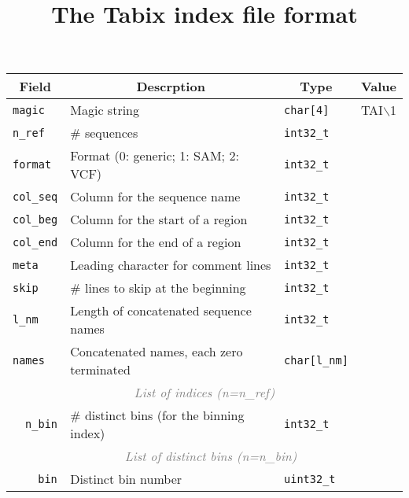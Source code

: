 \documentclass[10pt]{article}
\begin{document}
\title{The Tabix index file format}
\author{}
\date{}

\maketitle

\begin{center}
\begin{tabular}{|l|l|l|l|l|l|l|}
\hline
\multicolumn{4}{|c|}{\bf Field} & \multicolumn{1}{c|}{\bf Descrption} & \multicolumn{1}{c|}{\bf Type} & \multicolumn{1}{c|}{\bf Value} \\
\hline\hline
\multicolumn{4}{|l|}{\tt magic} & Magic string & {\tt char[4]} & TAI$\backslash$1 \\
\hline
\multicolumn{4}{|l|}{\tt n\_ref} & \# sequences & {\tt int32\_t} & \\
\hline
\multicolumn{4}{|l|}{\tt format} & Format (0: generic; 1: SAM; 2: VCF) & {\tt int32\_t} & \\
\hline
\multicolumn{4}{|l|}{\tt col\_seq} & Column for the sequence name & {\tt int32\_t} & \\
\hline
\multicolumn{4}{|l|}{\tt col\_beg} & Column for the start of a region & {\tt int32\_t} & \\
\hline
\multicolumn{4}{|l|}{\tt col\_end} & Column for the end of a region & {\tt int32\_t} & \\
\hline
\multicolumn{4}{|l|}{\tt meta} & Leading character for comment lines & {\tt int32\_t} & \\
\hline
\multicolumn{4}{|l|}{\tt skip} & \# lines to skip at the beginning & {\tt int32\_t} & \\
\hline
\multicolumn{4}{|l|}{\tt l\_nm} & Length of concatenated sequence names & {\tt int32\_t} & \\
\hline
\multicolumn{4}{|l|}{\tt names} & Concatenated names, each zero terminated & {\tt char[l\_nm]} & \\
\hline
\multicolumn{7}{|c|}{\textcolor{gray}{\it List of indices (n=n\_ref)}}\\
\cline{2-7}
\hspace{0.1cm} & \multicolumn{3}{l|}{\tt n\_bin} & \# distinct bins (for the binning index) & {\tt int32\_t} & \\
\cline{2-7}
 & \multicolumn{6}{c|}{\textcolor{gray}{\it List of distinct bins (n=n\_bin)}} \\
\cline{3-7}
 & \hspace{0.1cm} & \multicolumn{2}{l|}{\tt bin} & Distinct bin number & {\tt uint32\_t} & \\

\end{tabular}
\end{center}
\end{document}
